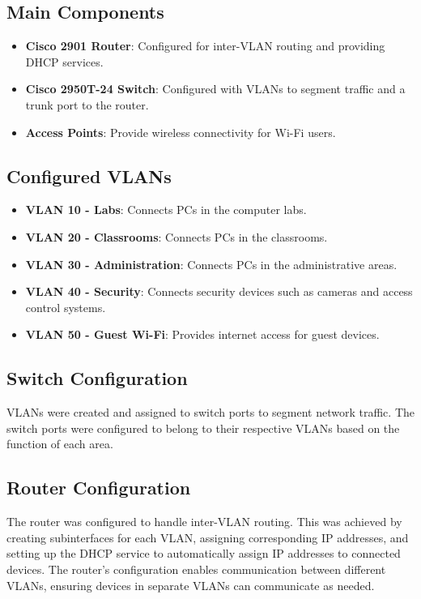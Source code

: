 \documentclass[12pt]{article}
\begin{document}
\subsection{Main Components}

\begin{itemize}
    \item \textbf{Cisco 2901 Router}: Configured for inter-VLAN routing and providing DHCP services.
    \item \textbf{Cisco 2950T-24 Switch}: Configured with VLANs to segment traffic and a trunk port to the router.
    \item \textbf{Access Points}: Provide wireless connectivity for Wi-Fi users.
\end{itemize}

\subsection{Configured VLANs}

\begin{itemize}
    \item \textbf{VLAN 10 - Labs}: Connects PCs in the computer labs.
    \item \textbf{VLAN 20 - Classrooms}: Connects PCs in the classrooms.
    \item \textbf{VLAN 30 - Administration}: Connects PCs in the administrative areas.
    \item \textbf{VLAN 40 - Security}: Connects security devices such as cameras and access control systems.
    \item \textbf{VLAN 50 - Guest Wi-Fi}: Provides internet access for guest devices.
\end{itemize}

\subsection{Switch Configuration}

VLANs were created and assigned to switch ports to segment network traffic. The switch ports were configured to belong to their respective VLANs based on the function of each area.

\subsection{Router Configuration}

The router was configured to handle inter-VLAN routing. This was achieved by creating subinterfaces for each VLAN, assigning corresponding IP addresses, and setting up the DHCP service to automatically assign IP addresses to connected devices. The router's configuration enables communication between different VLANs, ensuring devices in separate VLANs can communicate as needed.
\end{document}
